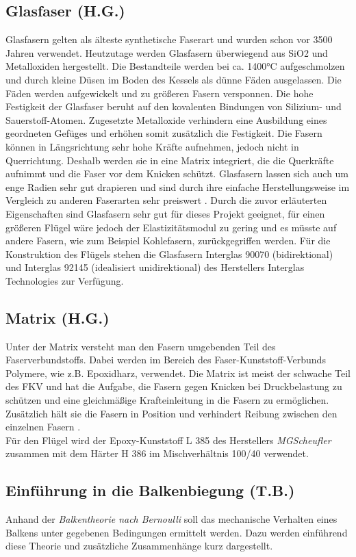 \subsection{Glasfaser (H.G.)}
\label{Glasfaser}
Glasfasern gelten als älteste synthetische Faserart und wurden schon vor 3500 Jahren verwendet. Heutzutage werden Glasfasern überwiegend aus SiO2 und Metalloxiden hergestellt. Die Bestandteile werden bei ca. 1400°C aufgeschmolzen und durch kleine Düsen im Boden des Kessels als dünne Fäden ausgelassen. Die Fäden werden aufgewickelt und zu größeren Fasern versponnen\cite{item3}.
Die hohe Festigkeit der Glasfaser beruht auf den kovalenten Bindungen von Silizium- und Sauerstoff-Atomen. Zugesetzte Metalloxide verhindern eine Ausbildung eines geordneten Gefüges und erhöhen somit zusätzlich die Festigkeit. Die Fasern können in Längsrichtung sehr hohe Kräfte aufnehmen, jedoch nicht in Querrichtung. Deshalb werden sie in eine Matrix integriert, die die Querkräfte aufnimmt und die Faser vor dem Knicken schützt. Glasfasern lassen sich auch um enge Radien sehr gut drapieren und sind durch ihre einfache Herstellungsweise im Vergleich zu anderen Faserarten sehr preiswert \cite{item4}.
Durch die zuvor erläuterten Eigenschaften sind Glasfasern sehr gut für dieses Projekt geeignet, für einen größeren Flügel wäre jedoch der Elastizitätsmodul zu gering und es müsste auf andere Fasern, wie zum Beispiel Kohlefasern, zurückgegriffen werden. 
Für die Konstruktion des Flügels stehen die Glasfasern Interglas 90070 (bidirektional) und Interglas 92145 (idealisiert unidirektional) des Herstellers Interglas Technologies zur Verfügung. 
\parskip
\parskip
\subsection{Matrix (H.G.)}
Unter der Matrix versteht man den Fasern umgebenden Teil des Faserverbundstoffs. Dabei werden im Bereich des Faser-Kunststoff-Verbunds Polymere, wie z.B. Epoxidharz, verwendet. Die Matrix ist meist der schwache Teil des FKV und hat die Aufgabe, die Fasern gegen Knicken bei Druckbelastung zu schützen und eine gleichmäßige Krafteinleitung in die Fasern zu ermöglichen. Zusätzlich hält sie die Fasern in Position und verhindert Reibung zwischen den einzelnen Fasern \cite{item3}.\\
Für den Flügel wird der Epoxy-Kunststoff L 385 des Herstellers \textit{MGScheufler} zusammen mit dem Härter H 386 im Mischverhältnis 100/40 verwendet.
\newpage

\subsection{Einführung in die Balkenbiegung (T.B.)}\label{Balken}
Anhand der \textit{Balkentheorie nach Bernoulli} soll das mechanische Verhalten eines Balkens unter gegebenen Bedingungen ermittelt werden. Dazu werden einführend diese Theorie und zusätzliche Zusammenhänge kurz dargestellt.\\

